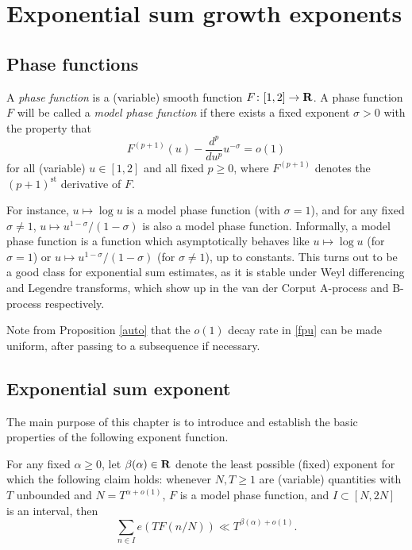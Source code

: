 \chapter{Exponential sum growth exponents}\label{beta-chapter}

\section{Phase functions}

\begin{definition}\label{phase-def}
A \emph{phase function} is a (variable) smooth function $F \colon [1,2] \to \mathbf{R}$.  A phase function $F$ will be called a \emph{model phase function} if there exists a fixed exponent $\sigma > 0$ with the property that
\begin{equation}\label{fpu}
F^{(p+1)}(u) - \frac{d^p}{du^p} u^{-\sigma} = o(1)
\end{equation}
for all (variable) $u \in [1,2]$ and all fixed $p \geq 0$, where $F^{(p+1)}$ denotes the $(p+1)^{\mathrm{st}}$ derivative of $F$.
\end{definition}

For instance, $u \mapsto \log u$ is a model phase function (with $\sigma=1$), and for any fixed $\sigma \neq 1$, $u \mapsto u^{1-\sigma}/(1-\sigma)$ is also a model phase function.  Informally, a model phase function is a function which asymptotically behaves like $u \mapsto \log u$ (for $\sigma = 1$) or $u \mapsto u^{1-\sigma}/(1-\sigma)$ (for $\sigma \neq 1$), up to constants.  This turns out to be a good class for exponential sum estimates, as it is stable under Weyl differencing and Legendre transforms, which show up in the van der Corput A-process and B-process respectively.

Note from Proposition \ref{auto} that the $o(1)$ decay rate in \eqref{fpu} can be made uniform, after passing to a subsequence if necessary.

\section{Exponential sum exponent}

The main purpose of this chapter is to introduce and establish the basic properties of the following exponent function.

\begin{definition}\label{beta-def}  For any fixed $\alpha \geq 0$, let $\beta(\alpha) \in \mathbf{R}$ denote the least possible (fixed) exponent for which the following claim holds: whenever $N, T \geq 1$ are (variable) quantities with $T$ unbounded and $N = T^{\alpha+o(1)}$, $F$ is a model phase function, and $I \subset [N, 2N]$ is an interval, then
$$ \sum_{n \in I} e(T F(n/N)) \ll T^{\beta(\alpha)+o(1)}.$$
\end{definition}

